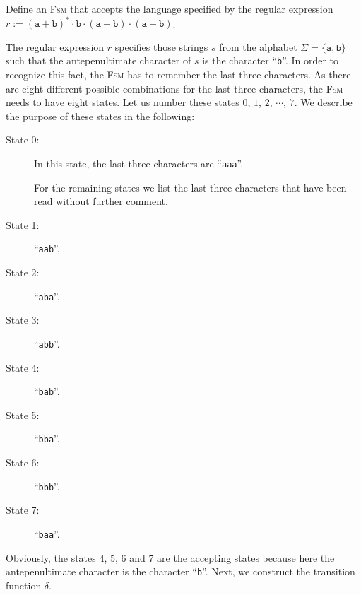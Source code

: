 \exerciseEng
Define an \textsc{Fsm} that accepts the language specified by the regular expression 
\\[0.2cm]
\hspace*{1.3cm}
$r := (\texttt{a}+\texttt{b})^* \cdot \texttt{b} \cdot (\texttt{a}+\texttt{b}) \cdot
(\texttt{a}+\texttt{b})$. \eox

\solutionEng
The regular expression $r$ specifies those strings $s$ from the alphabet 
$\Sigma = \{ \mathtt{a}, \mathtt{b} \}$ such that the antepenultimate character of $s$ is the
character ``\texttt{b}''.  In order to recognize this fact, the \textsc{Fsm} has to remember the
last three characters.  As there are eight different possible combinations for the last three
characters, the \textsc{Fsm} needs to have eight states.  Let us number these states 
 $0$, $1$, $2$, $\cdots$, $7$.  We describe the purpose of these states in the following:
\begin{description}
\item[State 0:] In this state, the last three characters are ``\texttt{aaa}''.  

                For the remaining states we list the last three characters  that have been read
                without further comment.
\item[State 1:] ``\texttt{aab}''.
\item[State 2:] ``\texttt{aba}''.
\item[State 3:] ``\texttt{abb}''.
\item[State 4:] ``\texttt{bab}''.
\item[State 5:] ``\texttt{bba}''.
\item[State 6:] ``\texttt{bbb}''.
\item[State 7:] ``\texttt{baa}''.
\end{description}
Obviously, the states 4, 5, 6 and 7 are the accepting states because here the antepenultimate
character is the character ``\texttt{b}''.  Next, we construct the transition function $\delta$.
